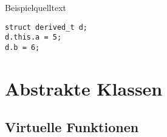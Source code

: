 \documentclass{article}
\newenvironment{code}{\captionsetup{type=listing}}{}
\begin{document}
\begin{code}
\caption{Beispielquelltext}
\begin{verbatim}
struct derived_t d;
d.this.a = 5;
d.b = 6;
\end{verbatim}
\end{code}


\section{Abstrakte Klassen}
\subsection{Virtuelle Funktionen}










\end{document}
